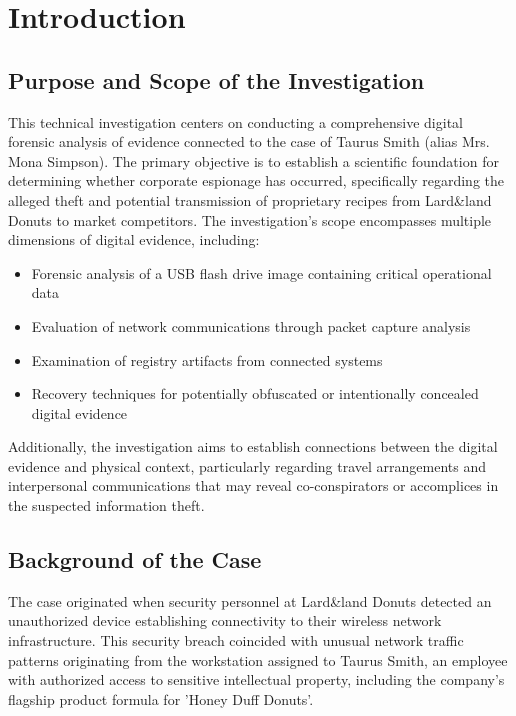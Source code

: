 \chapter{Introduction}

\section{Purpose and Scope of the Investigation}
This technical investigation centers on conducting a comprehensive digital forensic analysis of evidence connected to the case of Taurus Smith (alias Mrs. Mona Simpson). The primary objective is to establish a scientific foundation for determining whether corporate espionage has occurred, specifically regarding the alleged theft and potential transmission of proprietary recipes from Lard\&land Donuts to market competitors. The investigation's scope encompasses multiple dimensions of digital evidence, including:

\begin{itemize}
    \item Forensic analysis of a USB flash drive image containing critical operational data
    \item Evaluation of network communications through packet capture analysis
    \item Examination of registry artifacts from connected systems
    \item Recovery techniques for potentially obfuscated or intentionally concealed digital evidence
\end{itemize}

Additionally, the investigation aims to establish connections between the digital evidence and physical context, particularly regarding travel arrangements and interpersonal communications that may reveal co-conspirators or accomplices in the suspected information theft.

\section{Background of the Case}
The case originated when security personnel at Lard\&land Donuts detected an unauthorized device establishing connectivity to their wireless network infrastructure. This security breach coincided with unusual network traffic patterns originating from the workstation assigned to Taurus Smith, an employee with authorized access to sensitive intellectual property, including the company's flagship product formula for 'Honey Duff Donuts'.

